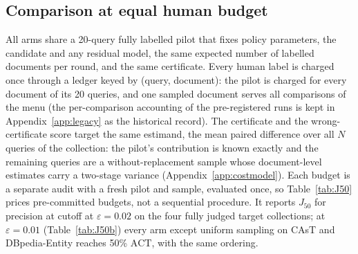 \documentclass{article}
\newcommand{\eps}{\varepsilon}
\newcommand{\ACT}{\mathrm{ACT}}
\newcommand{\Jfifty}{J_{50}}
\begin{document}
\subsection{Comparison at equal human budget}\label{sec:table2}
All arms share a 20-query fully labelled pilot that fixes policy parameters, the candidate and any residual model, the same expected number of labelled documents per round, and the same certificate. Every human label is charged once through a ledger keyed by (query, document): the pilot is charged for every document of its 20 queries, and one sampled document serves all comparisons of the menu (the per-comparison accounting of the pre-registered runs is kept in Appendix~\ref{app:legacy} as the historical record). The certificate and the wrong-certificate score target the same estimand, the mean paired difference over all $N$ queries of the collection: the pilot's contribution is known exactly and the remaining queries are a without-replacement sample whose document-level estimates carry a two-stage variance (Appendix~\ref{app:costmodel}). Each budget is a separate audit with a fresh pilot and sample, evaluated once, so Table~\ref{tab:J50} prices pre-committed budgets, not a sequential procedure. It reports $\Jfifty$ for precision at cutoff at $\eps=0.02$ on the four fully judged target collections; at $\eps=0.01$ (Table~\ref{tab:J50b}) every arm except uniform sampling on CAsT and DBpedia-Entity reaches 50\% $\ACT$, with the same ordering.
\end{document}
